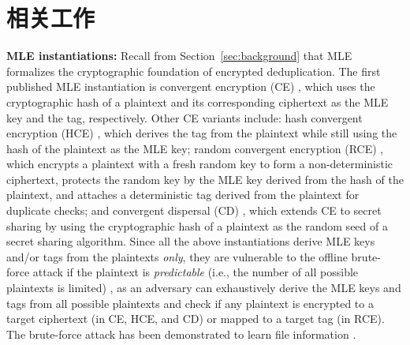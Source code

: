 \chapter{相关工作}
\label{sec:RelatedWork}

\noindent
{\bf MLE instantiations:}  
Recall from Section~\ref{sec:background} that MLE \cite{bellare13a} formalizes the
cryptographic foundation of encrypted deduplication.  The first published MLE
instantiation is convergent encryption (CE) \cite{douceur02}, which uses the
cryptographic hash of a plaintext and its corresponding ciphertext as the
MLE key and the tag, respectively.  Other CE variants include: hash convergent
encryption (HCE) \cite{bellare13a}, which derives the tag from the plaintext
while still using the hash of the plaintext as the MLE key; random convergent
encryption (RCE) \cite{bellare13a}, which encrypts a plaintext with a fresh
random key to form a non-deterministic ciphertext, protects the random key by
the MLE key derived from the hash of the plaintext, and attaches a
deterministic tag derived from the plaintext for duplicate checks; and
convergent dispersal (CD) \cite{li15}, which extends CE to secret sharing by
using the cryptographic hash of a plaintext as the random seed of a secret
sharing algorithm.  Since all the above instantiations derive MLE keys and/or
tags from the plaintexts {\em only}, they are vulnerable to the offline
brute-force attack \cite{bellare13b} if the plaintext is {\em predictable}
(i.e., the number of all possible plaintexts is limited) , as an adversary can
exhaustively derive the MLE keys and tags from all possible plaintexts and
check if any plaintext is encrypted to a target ciphertext (in CE, HCE, and
CD) or mapped to a target tag (in RCE).  The brute-force attack has been
demonstrated to learn file information \cite{ce_attack}.


  
